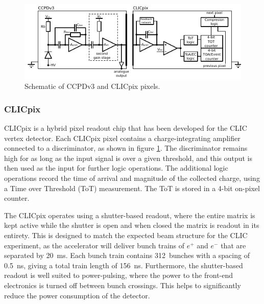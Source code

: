\begin{figure}[h!]
\centering
\includegraphics[width=1.0\textwidth]{CLICdpVertex/Plots/schematic.pdf}
\caption[Schematic of CCPDv3 and CLICpix pixels.]{Schematic of CCPDv3 and CLICpix pixels.}
\label{fig:ccpdandclicpix}
\end{figure}


\subsubsection{CLICpix}

CLICpix is a hybrid pixel readout chip that has been developed for the CLIC vertex detector. Each CLICpix pixel contains a charge-integrating amplifier connected to a discriminator, as shown in figure \ref{fig:ccpdandclicpix}.  The discriminator remains high for as long as the input signal is over a given threshold, and this output is then used as the input for further logic operations.  The additional logic operations record the time of arrival and magnitude of the collected charge, using a Time over Threshold (ToT) measurement. The ToT is stored in a 4-bit on-pixel counter.  

The CLICpix operates using a shutter-based readout, where the entire matrix is kept active while the shutter is open and when closed the matrix is readout in its entirety.  This is designed to match the expected beam structure for the CLIC experiment, as the accelerator will deliver bunch trains of $e^{+}$ and $e^{-}$ that are separated by 20~ms.  Each bunch train contains 312~bunches with a spacing of 0.5~ns, giving a total train length of 156~ns.  Furthermore, the shutter-based readout is well suited to power-pulsing, where the power to the front-end electronics is turned off between bunch crossings.  This helps to significantly reduce the power consumption of the detector.

